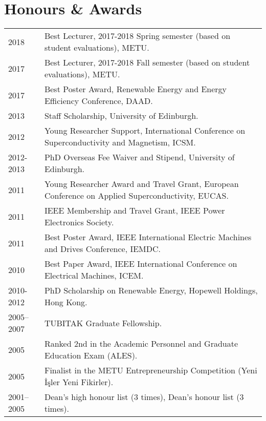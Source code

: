 \documentclass[a4paper,12pt]{article}
\begin{document}
\section{Honours \& Awards}
\begin{tabular}{lp{16cm}}
2018 & Best Lecturer, 2017-2018 Spring semester (based on student evaluations), METU. \\
2017 & Best Lecturer, 2017-2018 Fall semester (based on student evaluations), METU. \\
2017 & Best Poster Award, Renewable Energy and Energy Efficiency Conference, DAAD. \\
2013 & Staff Scholarship, University of Edinburgh. \\
2012 & Young Researcher Support, International Conference on Superconductivity and Magnetism, ICSM.\\ 
2012-2013 & PhD Overseas Fee Waiver and Stipend, University of Edinburgh. \\
2011 & Young Researcher Award and Travel Grant, European Conference on Applied Superconductivity, EUCAS.\\ 
2011 & IEEE Membership and Travel Grant, IEEE Power Electronics Society. \\ 
2011 & Best Poster Award, IEEE International Electric Machines and Drives Conference, IEMDC. \\
2010 & Best Paper Award, IEEE International Conference on Electrical Machines, ICEM. \\
2010-2012 & PhD Scholarship on Renewable Energy, Hopewell Holdings, Hong Kong. \\
2005--2007 & TUBITAK Graduate Fellowship. \\
2005 & Ranked 2nd in the Academic Personnel and Graduate Education Exam (ALES).\\
2005 & Finalist in the METU Entrepreneurship Competition (Yeni İşler Yeni Fikirler).\\
2001--2005 & Dean's high honour list (3 times), Dean's honour list (3 times). \\
\end{tabular}
\end{document}
